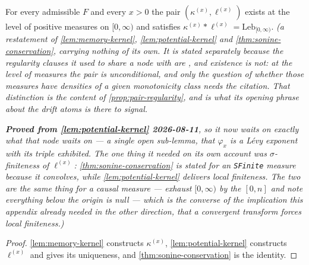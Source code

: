 \begin{proposition}\label{prop:sonine-pair-exists}
\leanok
For every admissible $F$ and every $x > 0$ the pair $(\kappa^{(x)}, \ell^{(x)})$ exists at the
level of positive measures on $[0,\infty)$ and satisfies
$\kappa^{(x)} * \ell^{(x)} = \mathrm{Leb}_{[0,\infty)}$.
\statusT\quad\emph{(a restatement of \ref{lem:memory-kernel}, \ref{lem:potential-kernel} and
\ref{thm:sonine-conservation}, carrying nothing of its own. It is stated separately because the
regularity clauses it used to share a node with are , and existence is not: at the
level of measures the pair is unconditional, and only the question of whether those measures
have \emph{densities of a given monotonicity class} needs the citation. That distinction is the
content of \ref{prop:pair-regularity}, and is what its opening phrase about the drift atoms is
there to signal.}

\emph{\textbf{Proved from \ref{lem:potential-kernel} 2026-08-11}, so it now waits on exactly what
that node waits on --- a single open sub-lemma, that $\varphi_x$ is a L\'evy exponent with its
triple exhibited. The one thing it needed on its own account was $\sigma$-finiteness of
$\ell^{(x)}$: \ref{thm:sonine-conservation} is stated for an \texttt{SFinite} measure because it
convolves, while \ref{lem:potential-kernel} delivers \emph{local} finiteness. The two are the same
thing for a causal measure --- exhaust $[0,\infty)$ by the $[0,n]$ and note everything below the
origin is null --- which is the converse of the implication this appendix already needed in the
other direction, that a convergent transform forces local finiteness.)}
\end{proposition}

\begin{proof}
\leanok
\ref{lem:memory-kernel} constructs $\kappa^{(x)}$, \ref{lem:potential-kernel} constructs
$\ell^{(x)}$ and gives its uniqueness, and \ref{thm:sonine-conservation} is the identity.
\end{proof}

